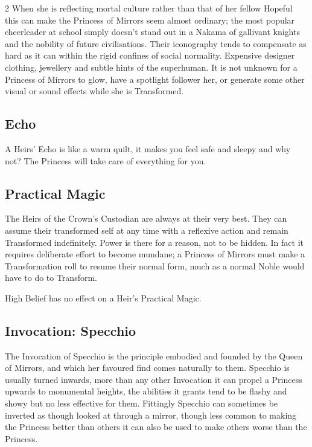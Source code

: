 \begin{multicols}{2}
When she is reflecting mortal culture rather than that of her fellow Hopeful this can make the Princess of Mirrors seem almost ordinary; the most popular cheerleader at school simply doesn’t stand out in a Nakama of gallivant knights and the nobility of future civilisations. Their iconography tends to compensate as hard as it can within the rigid confines of social normality. Expensive designer clothing, jewellery and subtle hints of the superhuman. It is not unknown for a Princess of Mirrors to glow, have a spotlight follower her, or generate some other visual or sound effects while she is Transformed. 


\subsection*{Echo}
A Heirs' Echo is like a warm quilt, it makes you feel safe and sleepy and why not? The Princess will take care of everything for you. 
\subsection*{Practical Magic}
The Heirs of the Crown's Custodian are always at their very best. They can assume their transformed self at any time with a reflexive action and remain Transformed indefinitely. Power is there for a reason, not to be hidden. In fact it requires deliberate effort to become mundane; a Princess of Mirrors must make a Transformation roll to resume their normal form, much as a normal Noble would have to do to Transform. 

High Belief has no effect on a Heir's Practical Magic. 
\subsection*{Invocation: Specchio}

The Invocation of Specchio is the principle embodied and founded by the Queen of Mirrors, and which her favoured find comes naturally to them. Specchio is usually turned inwards, more than any other Invocation it can propel a Princess upwards to monumental heights, the abilities it grants tend to be flashy and showy but no less effective for them. Fittingly Specchio can sometimes be inverted as though looked at through a mirror, though less common to making the Princess better than others it can also be used to make others worse than the Princess.


\end{multicols}
